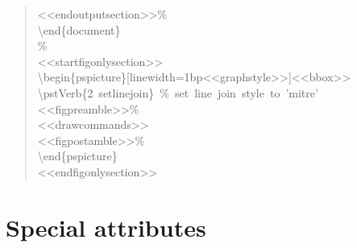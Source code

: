 \documentclass[10pt,a4paper,english]{article}
\begin{document}
\begin{quote}
{<{}<endoutputsection>{}>{\%}~\\
{\textbackslash}end{\{}document{\}}~\\
{\%}~\\
<{}<startfigonlysection>{}>~\\
{\textbackslash}begin{\{}pspicture{\}}{[}linewidth=1bp<{}<graphstyle>{}>{]}<{}<bbox>{}>~\\
{\textbackslash}pstVerb{\{}2~setlinejoin{\}}~{\%}~set~line~join~style~to~'mitre'~\\
<{}<figpreamble>{}>{\%}~\\
<{}<drawcommands>{}>~\\
<{}<figpostamble>{}>{\%}~\\
{\textbackslash}end{\{}pspicture{\}}~\\
<{}<endfigonlysection>{}>
}\end{quote}



\hypertarget{special-attributes}{}
\section*{Special attributes}
\label{special-attributes}
\end{document}
